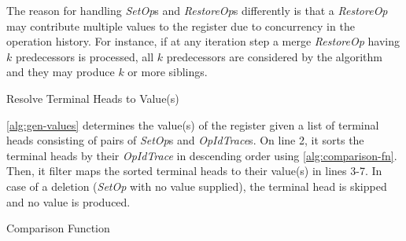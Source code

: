 \documentclass[sigplan]{acmart}
\newcommand{\setopkind}{\textit{SetOp}}
\newcommand{\restopkind}{\textit{RestoreOp}}
\newcommand{\opidtrace}{\textit{OpIdTrace}}
\begin{document}
The reason for handling \setopkind{}s and \restopkind{}s differently 
is that a \restopkind{} may contribute multiple values to
the register due to concurrency in the operation history.
For instance, if at any iteration step a merge \restopkind{} having $k$
predecessors is processed, all $k$ predecessors are considered by the algorithm
and they may produce $k$ or more siblings.

\begin{algorithm}
  \caption{Resolve Terminal Heads to Value(s)}\label{alg:gen-values}
  \begin{algorithmic}[1]
          \EndIf{}
        \EndFor{}
    \EndFunction{}
  \end{algorithmic}
\end{algorithm}

\autoref{alg:gen-values} determines the value(s) of the register
given a list of terminal heads consisting of pairs of \setopkind{}s and
\opidtrace{}s.
On line 2, it sorts the terminal heads by their \opidtrace{}
in descending order using \cref{alg:comparison-fn}.
Then, it filter maps the sorted terminal heads to their value(s) in lines 3-7.
In case of a deletion (\setopkind{} with no value supplied),
the terminal head is skipped and no value is produced.

\begin{algorithm}
  \caption{Comparison Function}\label{alg:comparison-fn}
  \begin{algorithmic}[1]
        \EndIf{}
      \EndFor{}
    \EndFunction{}
  \end{algorithmic}
\end{algorithm}
\end{document}
